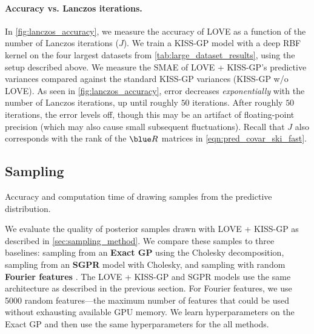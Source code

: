 \paragraph{Accuracy vs. Lanczos iterations.}
In \cref{fig:lanczos_accuracy}, we measure the accuracy of LOVE{} as a function of the number of Lanczos iterations ($J$).
We train a KISS-GP model with a deep RBF kernel on the four largest datasets from \cref{tab:large_dataset_results}, using the setup described above.
We measure the SMAE of LOVE + KISS-GP's predictive variances compared against the standard KISS-GP variances (KISS-GP w/o LOVE).
As seen in \cref{fig:lanczos_accuracy}, error decreases \emph{exponentially} with the number of Lanczos iterations, up until roughly $50$ iterations.
After roughly $50$ iterations, the error levels off, though this may be an artifact of floating-point precision (which may also cause small subsequent fluctuations).
Recall that $J$ also corresponds with the rank of the $\blue \bR$ matrices in \cref{eqn:pred_covar_ski_fast}.



\subsection{Sampling}

\begin{table}[t!]
  \caption[Accuracy and computation time of drawing samples from the predictive distribution.]{
    Accuracy and computation time of drawing samples from the predictive distribution.
    \label{tab:sampling_results}
  }
  \vspace{0.5ex}
  \centering
  \resizebox{\textwidth}{!}{%
    
  }
  \vspace{1em}

  \resizebox{\textwidth}{!}{%
    
  }
\end{table}

We evaluate the quality of posterior samples drawn with LOVE + KISS-GP{} as described in \cref{sec:sampling_method}.
We compare these samples to three baselines: sampling from an {\bf Exact GP} using the Cholesky decomposition, sampling from an {\bf SGPR} model with Cholesky, and sampling with random {\bf Fourier features} \citep{rahimi2008random}.
The LOVE + KISS-GP{} and SGPR models use the same architecture as described in the previous section.
For Fourier features, we use 5000 random features---the maximum number of features that could be used without exhausting available GPU memory.
We learn hyperparameters on the Exact GP and then use the same hyperparameters for the all methods.

